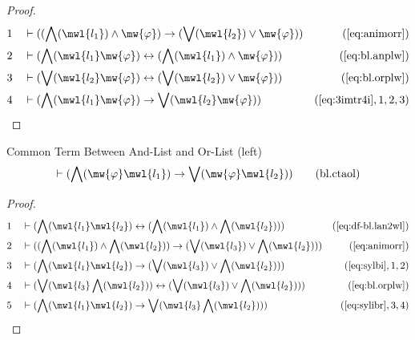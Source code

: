 \begin{proof}
\begin{align}
  1 &&  & \vdash ( ( \bigwedge( \mwl{l_1} ) \wedge \mw{\varphi} ) \rightarrow ( \bigvee( \mwl{l_2} ) \vee \mw{\varphi} ) )&(\mbox{\ref{eq:animorr}})\notag
  \\ 2 &&  & \vdash ( \bigwedge( \mwl{l_1} \mw{\varphi} ) \leftrightarrow ( \bigwedge( \mwl{l_1} ) \wedge \mw{\varphi} ) )&(\mbox{\ref{eq:bl.anplw}})\notag
  \\ 3 &&  & \vdash ( \bigvee( \mwl{l_2} \mw{\varphi} ) \leftrightarrow ( \bigvee( \mwl{l_2} ) \vee \mw{\varphi} ) )&(\mbox{\ref{eq:bl.orplw}})\notag
  \\ 4 &&  & \vdash ( \bigwedge( \mwl{l_1} \mw{\varphi} ) \rightarrow \bigvee( \mwl{l_2} \mw{\varphi} ) )&(\mbox{\ref{eq:3imtr4i}},1,2,3)\notag
\end{align}
\end{proof}

\begin{lemma} Common Term Between And-List and Or-List
(left)
\begin{align}
\vdash ( \bigwedge( \mw{\varphi} \mwl{l_1} ) \rightarrow \bigvee( \mw{\varphi}
    \mwl{l_2} ) )\label{eq:bl.ctaol}\tag{bl.ctaol}
\end{align}
\end{lemma}

\begin{proof}
\begin{align}
  1 &&  & \vdash ( \bigwedge( \mwl{l_1} \mwl{l_2} ) \leftrightarrow ( \bigwedge( \mwl{l_1} ) \wedge \bigwedge( \mwl{l_2} ) ) )&(\mbox{\ref{eq:df-bl.lan2wl}})\notag
  \\ 2 &&  & \vdash ( ( \bigwedge( \mwl{l_1} ) \wedge \bigwedge( \mwl{l_2} ) ) \rightarrow ( \bigvee( \mwl{l_3} ) \vee \bigwedge( \mwl{l_2} ) ) )&(\mbox{\ref{eq:animorr}})\notag
  \\ 3 &&  & \vdash ( \bigwedge( \mwl{l_1} \mwl{l_2} ) \rightarrow ( \bigvee( \mwl{l_3} ) \vee \bigwedge( \mwl{l_2} ) ) )&(\mbox{\ref{eq:sylbi}},1,2)\notag
  \\ 4 &&  & \vdash ( \bigvee( \mwl{l_3} \bigwedge( \mwl{l_2} ) ) \leftrightarrow ( \bigvee( \mwl{l_3} ) \vee \bigwedge( \mwl{l_2} ) ) )&(\mbox{\ref{eq:bl.orplw}})\notag
  \\ 5 &&  & \vdash ( \bigwedge( \mwl{l_1} \mwl{l_2} ) \rightarrow \bigvee( \mwl{l_3} \bigwedge( \mwl{l_2} ) ) )&(\mbox{\ref{eq:sylibr}},3,4)\notag
\end{align}
\end{proof}

